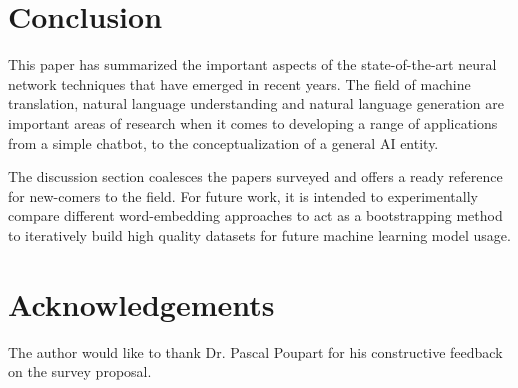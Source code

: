 \documentclass[11pt,a4paper]{article}
\begin{document}


\section{Conclusion} %
\label{sec:conclusion}

  This paper has summarized the important aspects of the state-of-the-art neural network techniques that have emerged in recent years. The field of machine translation, natural language understanding and natural language generation are important areas of research when it comes to developing a range of applications from a simple chatbot, to the conceptualization of a general AI entity.

  The discussion section coalesces the papers surveyed and offers a ready reference for new-comers to the field. For future work, it is intended to experimentally compare different word-embedding approaches to act as a bootstrapping method to iteratively build high quality datasets for future machine learning model usage.



\section{Acknowledgements} %
\label{sec:acknowledgements}

  The author would like to thank Dr. Pascal Poupart for his constructive feedback on the survey proposal.





\end{document}
